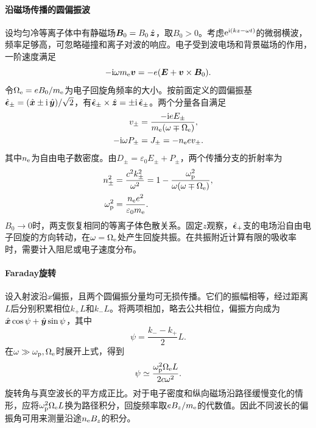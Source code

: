 \paragraph{沿磁场传播的圆偏振波}
设均匀冷等离子体中有静磁场$\bm B_0 = B_0\mathop{}\!\hat{\bm{z}}$，取$B_0 > 0$。考虑$\mathop{}\!\mathrm{e}^{\mathrm{i}(kz-\omega t)}$的微弱横波，频率足够高，可忽略碰撞和离子对波的响应。电子受到波电场和背景磁场的作用，一阶速度满足
\[
    -\mathrm{i}\omega m_{\mathrm{e}}\bm v = -e(\bm E + \bm v \times \bm B_0).
\]
令$\Omega_{\mathrm{e}} = eB_0/m_{\mathrm{e}}$为电子回旋角频率的大小。按前面定义的圆偏振基$\mathop{}\!\hat{\bm{\epsilon}}_\pm = (\mathop{}\!\hat{\bm{x}} \pm \mathrm{i}\mathop{}\!\hat{\bm{y}})/\sqrt2$，有$\mathop{}\!\hat{\bm{\epsilon}}_\pm \times \mathop{}\!\hat{\bm{z}} = \pm\mathrm{i}\mathop{}\!\hat{\bm{\epsilon}}_\pm$。两个分量各自满足
\begin{align*}
    v_\pm &= \frac{-\mathrm{i} e E_\pm}{m_{\mathrm{e}}(\omega \mp \Omega_{\mathrm{e}})},\\
    -\mathrm{i}\omega P_\pm &= J_\pm = -n_{\mathrm{e}} e v_\pm.
\end{align*}
其中$n_{\mathrm{e}}$为自由电子数密度。由$D_\pm = \varepsilon_0 E_\pm + P_\pm$，两个传播分支的折射率为
\begin{subequations}
    \begin{align}
        n_\pm^2 &= \frac{c^2 k_\pm^2}{\omega^2}
        = 1 - \frac{\omega_{\mathrm p}^2}{\omega(\omega \mp \Omega_{\mathrm{e}})},\\
        \omega_{\mathrm p}^2 &= \frac{n_{\mathrm{e}} e^2}{\varepsilon_0m_{\mathrm{e}}}.
    \end{align}
\end{subequations}
$B_0 \to 0$时，两支恢复相同的等离子体色散关系。固定$z$观察，$\mathop{}\!\hat{\bm{\epsilon}}_+$支的电场沿自由电子回旋的方向转动，在$\omega = \Omega_{\mathrm{e}}$处产生回旋共振。在共振附近计算有限的吸收率时，需要计入阻尼或电子速度分布。

\paragraph{Faraday旋转}
设入射波沿$x$偏振，且两个圆偏振分量均可无损传播。它们的振幅相等，经过距离$L$后分别积累相位$k_+L$和$k_-L$。将两项相加，略去公共相位，偏振方向成为$\mathop{}\!\hat{\bm{x}}\cos\psi + \mathop{}\!\hat{\bm{y}}\sin\psi$，其中
\begin{equation}
    \label{eq:ed-faraday-rotation}
    \psi = \frac{k_- - k_+}2 L.
\end{equation}
在$\omega \gg \omega_{\mathrm p},\Omega_{\mathrm{e}}$时展开上式，得到
\begin{equation}
    \psi \simeq \frac{\omega_{\mathrm p}^2\Omega_{\mathrm{e}} L}{2c\omega^2}.
\end{equation}
旋转角与真空波长的平方成正比。对于电子密度和纵向磁场沿路径缓慢变化的情形，应将$\omega_{\mathrm p}^2\Omega_{\mathrm{e}} L$换为路径积分，回旋频率取$eB_z/m_{\mathrm{e}}$的代数值。因此不同波长的偏振角可用来测量沿途$n_{\mathrm{e}} B_z$的积分。

